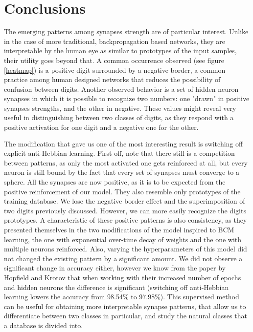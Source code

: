 \documentclass[a4paper]{report}
\begin{document}
\chapter{Conclusions}

The emerging patterns among synapses strength are of particular interest.
Unlike in the case of more traditional, backpropagation based networks, they are interpretable by the human eye as similar to prototypes of the input samples, their utility goes beyond that.
A common occurrence observed (see figure \ref{heatmap}) is a positive digit surrounded by a negative border, a common practice among human designed networks that reduces the possibility of confusion between digits.
Another observed behavior is a set of hidden neuron synapses in which it is possible to recognize two numbers:
one "drawn" in positive synapses strengths, and the other in negative.
These values might reveal very useful in distinguishing between two classes of digits, as they respond with a positive activation for one digit and a negative one for the other.

The modification that gave us one of the most interesting result is switching off explicit anti-Hebbian learning.
First off, note that there still is a competition between patterns, as only the most activated one gets reinforced at all, but every neuron is still bound by the fact that every set of synapses must converge to a sphere.
All the synapses are now positive, as it is to be expected from the positive reinforcement of our model.
They also resemble only prototypes of the training database.
We lose the negative border effect and the superimposition of two digits previously discussed.
However, we can more easily recognize the digits prototypes.
A characteristic of these positive patterns is also consistency, as they presented themselves in the two modifications of the model inspired to BCM learning, the one with exponential over-time decay of weights and the one with multiple neurons reinforced.
Also, varying the hyperparameters of this model did not changed the existing pattern by a significant amount.
We did not observe a significant change in accuracy either, however we know from the paper by Hopfield and Krotov that when working with their increased number of epochs and hidden neurons the difference is significant (switching off anti-Hebbian learning lowers the accuracy from 98.54\% to 97.98\%).
This supervised method can be useful for obtaining more interpretable synapse patterns, that allow us to differentiate between two classes in particular, and study the natural classes that a database is divided into.
\end{document}
